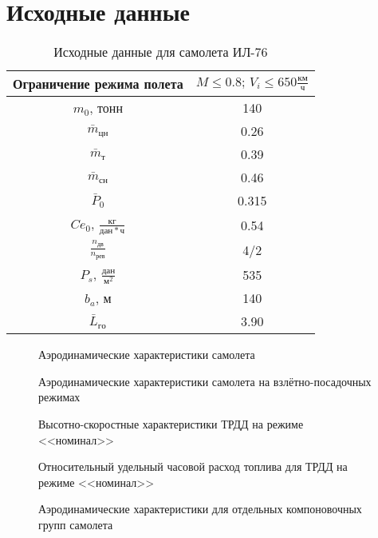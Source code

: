 \chapter{Исходные данные}

\begin{table}[H]
    \centering
    \caption{Исходные данные для самолета ИЛ-76}
    \label{tab:variant_data}
    \begin{tabular}{|c|c|}
        \hline
        Ограничение режима полета & $M \le 0.8; \, V_i \le 650 \frac{км}{ч}$\\
        \hline
        $m_0$, тонн & 140 \\ 
        \hline
        $\bar{m}_{цн}$ & 0.26\\ 
        \hline
        $\bar{m}_т$ & 0.39\\ 
        \hline
        $\bar{m}_{сн}$ & 0.46\\ 
        \hline
        $\bar{P}_0$ & 0.315\\ 
        \hline
        $Ce_0$, $\frac{кг}{дан \ast ч}$ & 0.54\\ 
        \hline
        $\frac{n_{дв}}{n_{рев}}$ & 4/2 \\ 
        \hline
        $P_s$, $\frac{дан}{м^2}$& 535 \\ 
        \hline
        $b_a$, м& 140 \\ 
        \hline
        $\bar{L}_{го}$ & 3.90 \\ 
        \hline
    \end{tabular}
\end{table}


\begin{figure}[H]
\centering
\resizebox{.79\linewidth}{!}{}
\caption{Аэродинамические характеристики самолета}
\label{fig:aero_data}
\end{figure}
\begin{figure}[H]
\centering
\resizebox{.79\linewidth}{!}{}
\caption{Аэродинамические характеристики самолета на взлётно-посадочных режимах}
\label{fig:aero_data_landing}
\end{figure}
\begin{figure}[H]
\centering
\resizebox{.79\linewidth}{!}{}
\caption{Высотно-скоростные характеристики ТРДД на режиме <<номинал>>}
\label{fig:tilda_P_data}
\end{figure}
\begin{figure}[H]
\centering
\resizebox{.79\linewidth}{!}{}
\caption{Относительный удельный часовой расход топлива для ТРДД на режиме <<номинал>>}
\label{fig:tilda_Ce_data}
\end{figure}
\begin{figure}[H]
\centering
\resizebox{.79\linewidth}{!}{}
\caption{Аэродинамические характеристики для отдельных компоновочных групп самолета}
\label{fig:aero_data_elements}
\end{figure}
